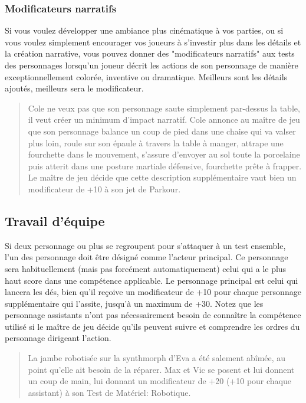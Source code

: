 \subsubsection{Modificateurs narratifs} \label{sec:narrative-modifiers} 

Si vous voulez développer une ambiance plus cinématique à vos parties, ou si vous voulez simplement encourager vos joueurs à s'investir plus dans les détails et la création narrative, vous pouvez donner des "modificateurs narratifs" aux tests des personnages lorsqu'un joueur décrit les actions de son personnage de manière exceptionnellement colorée, inventive ou dramatique. Meilleurs sont les détails ajoutés, meilleurs sera le modificateur. 

\begin{quotation} Cole ne veux pas que son personnage saute simplement par-dessus la table, il veut créer un minimum d'impact narratif. Cole annonce au maître de jeu que son personnage balance un coup de pied dans une chaise qui va valser plus loin, roule sur son épaule à travers la table à manger, attrape une fourchette dans le mouvement, s'assure d'envoyer au sol toute la porcelaine puis atterit dans une posture martiale défensive, fourchette prête à frapper. Le maître de jeu décide que cette description supplémentaire vaut bien un modificateur de +10 à son jet de Parkour. \end{quotation} 

\subsection{Travail d'équipe} \label{sec:teamwork} 

Si deux personnage ou plus se regroupent pour s'attaquer à un test ensemble, l'un des personnage doit être désigné comme l'acteur principal. Ce personnage sera habituellement (mais pas forcément automatiquement) celui qui a le plus haut score dans une compétence applicable. Le personnage principal est celui qui lancera les dés, bien qu'il reçoive un modificateur de +10 pour chaque personnage supplémentaire qui l'assite, jusqu'à un maximum de +30. Notez que les personnage assistants n'ont pas nécessairement besoin de connaître la compétence utilisé si le maître de jeu décide qu'ils peuvent suivre et comprendre les ordres du personnage dirigeant l'action. 

\begin{quotation} La jambe robotisée sur la synthmorph d'Eva a été salement abîmée, au point qu'elle ait besoin de la réparer. Max et Vic se posent et lui donnent un coup de main, lui donnant un modificateur de +20 (+10 pour chaque assistant) à son Test de Matériel: Robotique. \end{quotation} 

